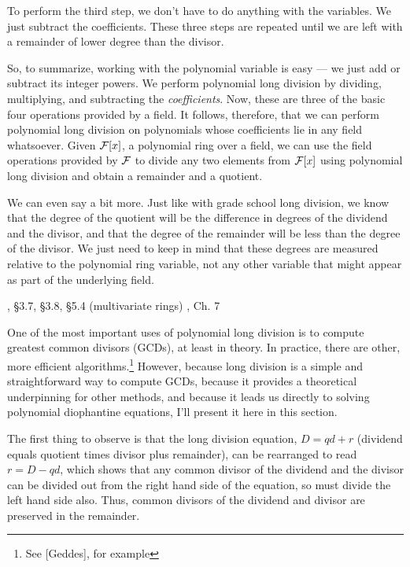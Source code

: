 To perform the third step, we don't have to do anything with
the variables.  We just subtract the coefficients.  These
three steps are repeated until we are left with a remainder
of lower degree than the divisor.

So, to summarize, working with the polynomial variable is easy --- we
just add or subtract its integer powers.  We perform polynomial long
division by dividing, multiplying, and subtracting the {\it
coefficients}.  Now, these are three of the basic four operations
provided by a field.  It follows, therefore, that we can perform
polynomial long division on polynomials whose coefficients lie in any
field whatsoever.  Given ${\cal F}[x]$, a polynomial ring over a
field, we can use the field operations provided by ${\cal F}$ to
divide any two elements from ${\cal F}[x]$ using polynomial long
division and obtain a remainder and a quotient.

We can even say a bit more.  Just like with grade school long
division, we know that the degree of the quotient will be the
difference in degrees of the dividend and the divisor, and that the
degree of the remainder will be less than the degree of the divisor.
We just need to keep in mind that these degrees are measured relative
to the polynomial ring variable, not any other variable that might
appear as part of the underlying field.

, \S3.7, \S3.8, \S5.4 (multivariate rings)\hfil\break
\hbox{}\qquad [Geddes], Ch. 7

One of the most important uses of polynomial long division is to
compute greatest common divisors (GCDs), at least in theory.  In
practice, there are other, more efficient algorithms.\footnote{See
[Geddes], for example} However, because long division is a simple and
straightforward way to compute GCDs, because it provides a theoretical
underpinning for other methods, and because it leads us directly to
solving polynomial diophantine equations, I'll present it here in this
section.

The first thing to observe is that the long division equation, $D = qd
+ r$ (dividend equals quotient times divisor plus remainder), can be
rearranged to read $r = D - qd$, which shows that any common divisor
of the dividend and the divisor can be divided out from the right hand
side of the equation, so must divide the left hand side also.  Thus,
common divisors of the dividend and divisor are preserved in the
remainder.


